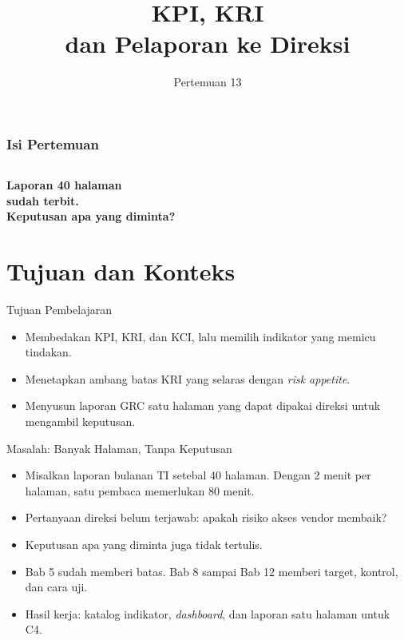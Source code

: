 \documentclass[aspectratio=169, table, 12pt]{beamer}
\title{\Huge KPI, KRI\\ \vspace{10pt} dan Pelaporan ke Direksi}
\date{Pertemuan 13}
\begin{document}
\frame{\titlepage}

\begin{frame}
  \frametitle{Isi Pertemuan}
  \vspace{14pt}
  \begin{columns}[t]
    {\small\tableofcontents[sections={1-5}]}

    {\small\tableofcontents[sections={6-9}]}
  \end{columns}
\end{frame}

\begin{frame}{\hfill}
  \centering
  \Huge{\textbf{Laporan 40 halaman\\sudah terbit.\\Keputusan apa yang diminta?}}
\end{frame}

\section{Tujuan dan Konteks}

\begin{frame}{{\Large Tujuan Pembelajaran}}
  \vspace{10pt}
  \begin{itemize}
    \item Membedakan KPI, KRI, dan KCI, lalu memilih indikator yang memicu tindakan.
    \item Menetapkan ambang batas KRI yang selaras dengan \textit{risk appetite}.
    \item Menyusun laporan GRC satu halaman yang dapat dipakai direksi untuk mengambil
          keputusan.
  \end{itemize}
\end{frame}

\begin{frame}{{\Large Masalah: Banyak Halaman, Tanpa Keputusan}}
  \vspace{6pt}
  \small
  \begin{itemize}
    \item Misalkan laporan bulanan TI setebal 40 halaman. Dengan 2 menit per halaman, satu
          pembaca memerlukan 80 menit.
    \item Pertanyaan direksi belum terjawab: apakah risiko akses vendor membaik?
    \item Keputusan apa yang diminta juga tidak tertulis.
    \item Bab 5 sudah memberi batas. Bab 8 sampai Bab 12 memberi target, kontrol, dan cara uji.
    \item Hasil kerja: katalog indikator, \textit{dashboard}, dan laporan satu halaman untuk C4.
  \end{itemize}
\end{frame}
\end{document}
